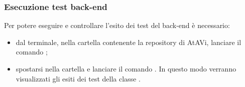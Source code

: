 \subsubsection{Esecuzione test back-end}
Per potere eseguire e controllare l'esito dei test del back-end è necessario:
\begin{itemize}
	\item dal terminale, nella cartella contenente la repository di AtAVi, lanciare il comando ;
	\item spostarsi nella cartella  e lanciare il comando . In questo modo verranno visualizzati gli esiti dei test della classe .
\end{itemize}
